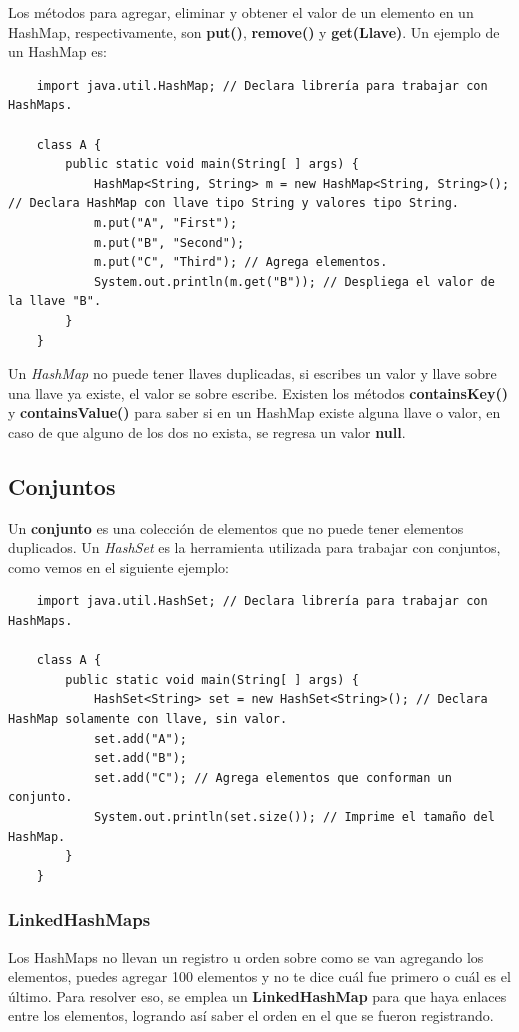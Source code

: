 Los métodos para agregar, eliminar y obtener el valor de un elemento en un HashMap, respectivamente, son \textbf{put()}, \textbf{remove()} y \textbf{get(Llave)}. Un ejemplo de un HashMap es:
\begin{lstlisting}
    import java.util.HashMap; // Declara librería para trabajar con HashMaps.
    
    class A {
        public static void main(String[ ] args) {
            HashMap<String, String> m = new HashMap<String, String>(); // Declara HashMap con llave tipo String y valores tipo String.
            m.put("A", "First");
            m.put("B", "Second");
            m.put("C", "Third"); // Agrega elementos.
            System.out.println(m.get("B")); // Despliega el valor de la llave "B".
        }
    }
\end{lstlisting}

Un \textit{HashMap} no puede tener llaves duplicadas, si escribes un valor y llave sobre una llave ya existe, el valor se sobre escribe. Existen los métodos \textbf{containsKey()} y \textbf{containsValue()} para saber si en un HashMap existe alguna llave o valor, en caso de que alguno de los dos no exista, se regresa un valor \textbf{null}.


\subsection{Conjuntos}
\hspace{0.55cm}Un \textbf{conjunto} es una colección de elementos que no puede tener elementos duplicados. Un \textit{HashSet} es la herramienta utilizada para trabajar con conjuntos, como vemos en el siguiente ejemplo:
\begin{lstlisting}
    import java.util.HashSet; // Declara librería para trabajar con HashMaps.
    
    class A {
        public static void main(String[ ] args) {
            HashSet<String> set = new HashSet<String>(); // Declara HashMap solamente con llave, sin valor.
            set.add("A");
            set.add("B");	
            set.add("C"); // Agrega elementos que conforman un conjunto.
            System.out.println(set.size()); // Imprime el tamaño del HashMap.
        }
    }
\end{lstlisting}


\subsubsection{LinkedHashMaps}
\hspace{0.55cm}Los HashMaps no llevan un registro u orden sobre como se van agregando los elementos, puedes agregar 100 elementos y no te dice cuál fue primero o cuál es el último. Para resolver eso, se emplea un \textbf{LinkedHashMap} para que haya enlaces entre los elementos, logrando así saber el orden en el que se fueron registrando.


